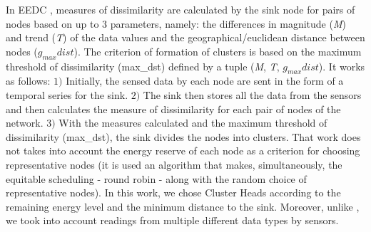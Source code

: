 \documentclass{acm_proc_article-sp}
\begin{document}
In EEDC \cite{Liu2007}, measures of dissimilarity are calculated by the sink
node for pairs of nodes based on up to $3$ parameters, namely:
the differences in magnitude (\textit{M}) and trend (\textit{T}) of the data
values and the geographical/euclidean distance between nodes ($g_{max}dist$).
The criterion of formation of clusters is based on the maximum threshold of
dissimilarity (max\_dst) defined by a tuple (\textit{M}, \textit{T},
$g_{max}dist$). It works as follows: $1)$ Initially, the sensed data by each
node are sent in the form of a temporal series for the sink. $2)$ The sink then
stores all the data from the sensors and then calculates the measure of
dissimilarity for each pair of nodes of the network. $3)$
With the measures calculated and the maximum threshold of dissimilarity
(max\_dst), the sink divides the nodes into clusters.
That work does not takes into account the energy reserve of each node as a
criterion for choosing representative nodes (it is used an algorithm that makes,
simultaneously, the equitable scheduling - round robin - along with the random
choice of representative nodes). In this work, we chose Cluster Heads according
to the remaining energy level and the minimum distance to the sink. Moreover,
unlike \cite{Liu2007}, we took into account readings from multiple different
data types by sensors.

\end{document}
